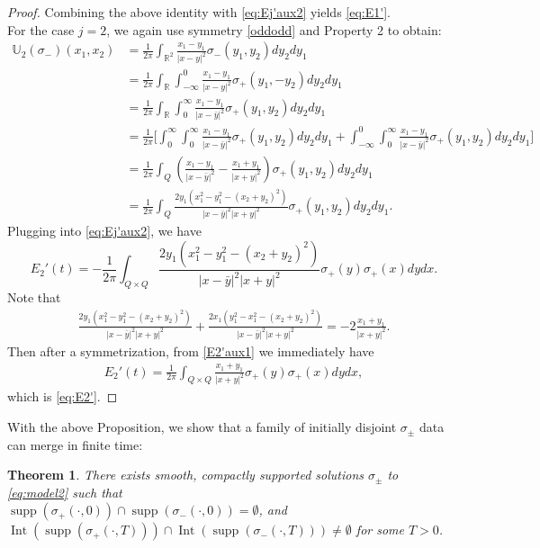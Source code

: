 \documentclass[11pt,reqno]{amsproc}
\newtheorem{thm}{Theorem}
\newcommand{\R}{\mathbb{R}}
\newcommand{\U}{\mathbb{U}}
\DeclareMathOperator{\supp}{supp}
\DeclareMathOperator{\Int}{Int}
\begin{document}
\begin{proof}
    Combining the above identity with \eqref{eq:Ej'aux2} yields \eqref{eq:E1'}.\\
    For the case $j = 2$, we again use symmetry \eqref{oddodd} and Property 2 to obtain:
    \begin{align*}
        \U_2(\sigma_-)(x_1,x_2) &= \frac{1}{2\pi}\int_{\R^2}\frac{x_1-y_1}{|x-y|^2}\sigma_-(y_1,y_2) dy_2 dy_1\\
        &= \frac{1}{2\pi}\int_{\R}\int_{-\infty}^0\frac{x_1-y_1}{|x-y|^2}\sigma_+(y_1,-y_2) dy_2 dy_1\\
        &= \frac{1}{2\pi}\int_{\R}\int^{\infty}_0\frac{x_1-y_1}{|x-\bar y|^2}\sigma_+(y_1,y_2) dy_2 dy_1\\
        &= \frac{1}{2\pi}\bigg[\int_0^\infty\int^{\infty}_0\frac{x_1-y_1}{|x-\bar y|^2}\sigma_+(y_1,y_2) dy_2 dy_1 + \int_{-\infty}^0\int^{\infty}_0\frac{x_1-y_1}{|x-\bar y|^2}\sigma_+(y_1,y_2) dy_2 dy_1\bigg]\\
        &= \frac{1}{2\pi}\int_Q \left(\frac{x_1-y_1}{|x-\bar y|^2} - \frac{x_1+y_1}{|x+ y|^2}\right)\sigma_+(y_1,y_2) dy_2 dy_1\\
        &= \frac{1}{2\pi}\int_Q \frac{2y_1(x_1^2 - y_1^2 -(x_2+y_2)^2)}{|x-\bar y|^2 |x+y|^2}\sigma_+(y_1,y_2) dy_2 dy_1.
    \end{align*}
    Plugging into \eqref{eq:Ej'aux2}, we have
    \begin{equation}\label{E2'aux1}
        E_2'(t) = -\frac{1}{2\pi}\int_{Q\times Q} \frac{2y_1(x_1^2 - y_1^2 -(x_2+y_2)^2)}{|x-\bar y|^2 |x+y|^2}\sigma_+(y)\sigma_+(x) dy dx.
    \end{equation}
    Note that
    \begin{align*}
        \frac{2y_1(x_1^2 - y_1^2 -(x_2+y_2)^2)}{|x-\bar y|^2 |x+y|^2} + \frac{2x_1(y_1^2 - x_1^2 -(x_2+y_2)^2)}{|x-\bar y|^2 |x+y|^2} = -2\frac{x_1 + y_1}{|x+y|^2}.
    \end{align*}
    Then after a symmetrization, from \eqref{E2'aux1} we immediately have
    \begin{align*}
        E_2'(t) = \frac{1}{2\pi}\int_{Q\times Q}\frac{x_1 + y_1}{|x+y|^2}\sigma_+(y)\sigma_+(x) dy dx,
    \end{align*}
    which is \eqref{eq:E2'}.
\end{proof}
With the above Proposition, we show that a family of initially disjoint $\sigma_\pm$ data can merge in finite time:
\begin{thm}\label{thm:overlap}
    There exists smooth, compactly supported solutions $\sigma_\pm$ to \eqref{eq:model2} such that\\ $\supp(\sigma_+(\cdot,0)) \cap \supp(\sigma_-(\cdot,0)) = \emptyset$, and $\Int(\supp(\sigma_+(\cdot,T))) \cap \Int(\supp(\sigma_-(\cdot,T))) \neq \emptyset$ for some $T > 0$.
\end{thm}
\end{document}
